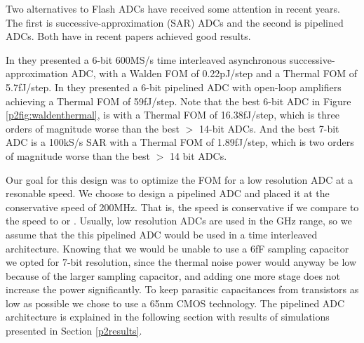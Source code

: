 


Two alternatives to Flash ADCs have received some attention in recent years. The first is
successive-approximation (SAR) ADCs and the second is pipelined ADCs. Both
have in recent papers achieved good results. 

In \cite{Chen06} they presented a
6-bit 600MS/s time interleaved asynchronous successive-approximation
ADC, with a Walden FOM of 0.22pJ/step and a Thermal FOM of
5.7fJ/step. In \cite{Shen07} they presented a 6-bit pipelined ADC with open-loop
amplifiers achieving a Thermal FOM of 59fJ/step.
Note that the best 6-bit ADC in Figure \ref{p2fig:waldenthermal}, is 
\cite{lin02} with a Thermal FOM of 16.38fJ/step, which is three orders of magnitude worse than
the best $>$ 14-bit ADCs. And the best 7-bit ADC is a 100kS/s SAR
\cite{Scott03} with a Thermal FOM of 1.89fJ/step, which is two orders of magnitude worse than the best
$>$ 14 bit ADCs.

Our goal for this design was to optimize the FOM for a low resolution
ADC at a resonable speed. 
We choose to design a pipelined ADC and placed it
at the conservative speed of 200MHz. That is, the speed is
conservative if we compare to the speed to
\cite{Shen07} or \cite{Chen06}. Usually, low resolution ADCs are used
in the GHz range, so we assume that the this pipelined ADC would be
used in a time interleaved architecture. Knowing that we would be unable
to use a 6fF sampling capacitor we opted for 7-bit resolution, since
the thermal noise power would anyway be low because of the larger
sampling capacitor, and adding one more stage
does not increase the power significantly. To keep parasitic
capacitances from transistors as low as possible we chose to use a
65nm CMOS technology. The pipelined ADC architecture is
explained in the following section with results of simulations
presented in Section \ref{p2results}.


